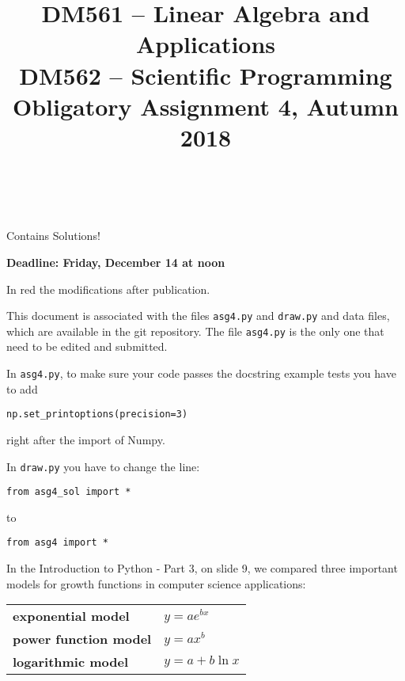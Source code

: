 \documentclass[a4paper,10pt]{article}
\title{%
\begin{flushleft}
  DM561 -- Linear Algebra and Applications\\
  DM562 -- Scientific Programming\\[0.3cm]
{\Large Obligatory Assignment 4, Autumn 2018} %
\\
\hrulefill
\\[-1.8cm]
\end{flushleft}
}
\author{}
\date{}
\begin{document}
\maketitle



\begin{solution}
Contains Solutions!
\end{solution}



\begin{center}
  {\bf Deadline: Friday, December 14 at noon}
\end{center}

\color{red}In red the modifications after publication.\color{black}


This document is associated with the files \lstinline{asg4.py} and
\lstinline{draw.py} and data files, which are available in the git
repository. The file \lstinline{asg4.py} is the only one that need to be
edited and submitted.

\bigskip

\color{red} In \lstinline{asg4.py}, to make sure your code passes the
docstring example tests you have to add
\begin{lstlisting}
np.set_printoptions(precision=3)
\end{lstlisting}

\vspace{-3ex}
right after the import of Numpy.

In  \lstinline{draw.py} you have to change the line:

\begin{lstlisting}
from asg4_sol import * 
\end{lstlisting}

\vspace{-3ex}

to
\begin{lstlisting}
from asg4 import * 
\end{lstlisting}
\color{black}


\bigskip

In the Introduction to Python - Part 3, on slide 9, we compared three
important models for growth functions in computer science applications:

\begin{table}[h]
  \begin{tabular}{ll}
    \textbf{exponential model}&$y=ae^{bx}$\\
    \textbf{power function model}&$y=ax^b$\\
    \textbf{logarithmic model}&$y=a+b\ln x$
  \end{tabular}
\end{table}
\end{document}
